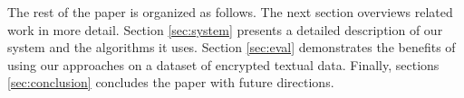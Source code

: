The rest of the paper is organized as follows. The next section overviews
related work in more detail.
Section \ref{sec:system} presents a detailed description of our system and the 
algorithms it uses.
Section \ref{sec:eval} demonstrates the benefits of using our approaches
on a dataset of encrypted textual data. Finally, sections \ref{sec:conclusion} concludes the paper with future directions.
